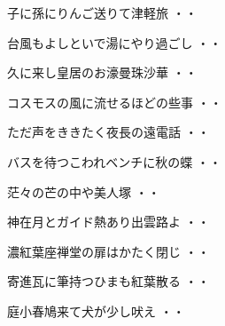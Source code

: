 \begin{shiika}子に孫にりんご送りて津軽旅
\hfill{・・}\end{shiika}
\vspace{0.6cm}
\begin{shiika}台風もよしといで湯にやり過ごし
\hfill{・・}\end{shiika}
\vspace{0.6cm}
\begin{shiika}久に来し皇居のお濠曼珠沙華
\hfill{・・}\end{shiika}
\vspace{0.6cm}
\begin{shiika}コスモスの風に流せるほどの些事
\hfill{・・}\end{shiika}
\vspace{0.6cm}
\begin{shiika}ただ声をききたく夜長の遠電話
\hfill{・・}\end{shiika}
\vspace{0.6cm}
\begin{shiika}バスを待つこわれベンチに秋の蝶
\hfill{・・}\end{shiika}
\vspace{0.6cm}
\begin{shiika}茫々の芒の中や美人塚
\hfill{・・}\end{shiika}
\vspace{0.6cm}
\begin{shiika}神在月とガイド熱あり出雲路よ
\hfill{・・}\end{shiika}
\vspace{0.6cm}
\begin{shiika}濃紅葉座禅堂の扉はかたく閉じ
\hfill{・・}\end{shiika}
\vspace{0.6cm}
\begin{shiika}寄進瓦に筆持つひまも紅葉散る
\hfill{・・}\end{shiika}
\vspace{0.6cm}
\begin{shiika}庭小春鳩来て犬が少し吠え
\hfill{・・}\end{shiika}
\vspace{0.6cm}
